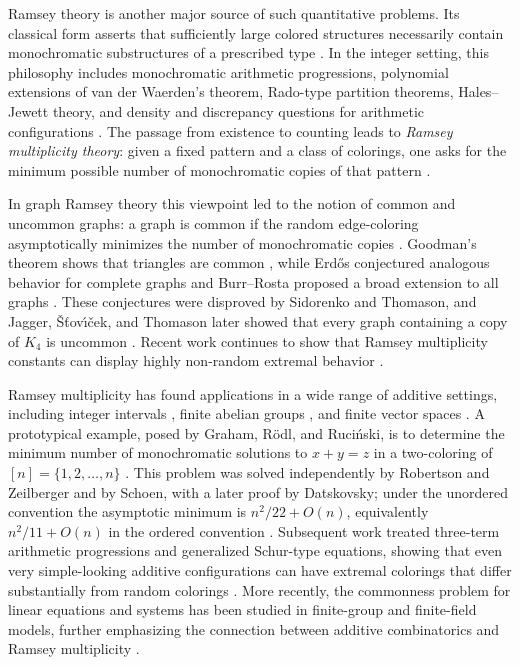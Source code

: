 \documentclass[twoside,12pt]{article}
\newcommand{\1}{\mathbf 1}
\begin{document}
Ramsey theory is another major source of such quantitative problems.  Its
classical form asserts that sufficiently large colored structures necessarily
contain monochromatic substructures of a prescribed type \cite{GRS90,LR04}.  In
the integer setting, this philosophy includes monochromatic arithmetic
progressions, polynomial extensions of van der Waerden's theorem, Rado-type
partition theorems, Hales--Jewett theory, and density and discrepancy questions
for arithmetic configurations \cite{BL96,BL99,CLP21,FK06,MS96,Po12,RR95,RR97,Sh88}.
The passage from existence to counting leads to \emph{Ramsey multiplicity
theory}: given a fixed pattern and a class of colorings, one asks for the
minimum possible number of monochromatic copies of that pattern
\cite{BR80,GRR96,JST96}.

In graph Ramsey theory this viewpoint led to the notion of common and uncommon
graphs: a graph is common if the random edge-coloring asymptotically minimizes
the number of monochromatic copies \cite{Goodman59,BR80,JST96}.  Goodman's
theorem shows that triangles are common \cite{Goodman59}, while Erd\H{o}s
conjectured analogous behavior for complete graphs and Burr--Rosta proposed a
broad extension to all graphs \cite{Erdos62,BR80}.  These conjectures were
disproved by Sidorenko and Thomason, and Jagger, \v{S}\v{t}ov\'\i\v{c}ek, and
Thomason later showed that every graph containing a copy of \(K_4\) is
uncommon \cite{Sidorenko89,Th89,JST96}.  Recent work continues to show that
Ramsey multiplicity constants can display highly non-random extremal behavior
\cite{FoxWigderson23}.

Ramsey multiplicity has found applications in a wide range of additive settings, including integer intervals \cite{CE23,GRR96}, finite abelian groups \cite{SW17,Ver23}, and finite vector spaces  \cite{FPZ21,RS26}.
A prototypical example, posed by Graham, R\"odl, and Ruci\'nski, is to
determine the minimum number of monochromatic solutions to \(x+y=z\) in a
two-coloring of \([n]=\{1,2,\ldots,n\}\) \cite{GRR96}.  This problem was
solved independently by Robertson and Zeilberger and by Schoen, with a later
proof by Datskovsky; under the unordered convention the asymptotic minimum is
\(n^2/22+O(n)\), equivalently \(n^2/11+O(n)\) in the ordered convention
\cite{Da03,RZ98,Sc99}.  Subsequent work treated three-term arithmetic
progressions and generalized Schur-type equations, showing that even very
simple-looking additive configurations can have extremal colorings that differ
substantially from random colorings \cite{PRS08,Th09,TW17}.  More recently,
the commonness problem for linear equations and systems has been studied in
finite-group and finite-field models, further emphasizing the connection
between additive combinatorics and Ramsey multiplicity \cite{CE23,FPZ21,RS26,SW17,Ver23}.
\end{document}
